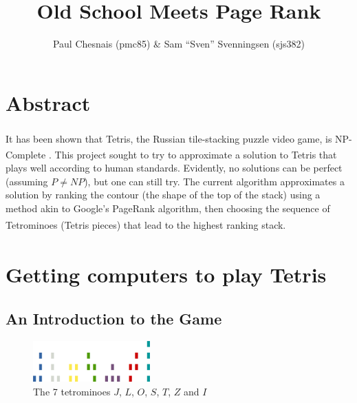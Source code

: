 \documentclass[fontsize=12pt]{article}
\title{Old School \tetris{} Meets Page Rank}
\author{Paul Chesnais (pmc85) \& Sam ``Sven'' Svenningsen (sjs382)}
\date{}
\def\tetris{Tetris\textsuperscript{\textregistered}}
\begin{document}
\maketitle
\thispagestyle{empty}
\section{Abstract}
\label{sec:abstract}

\par It has been shown that \tetris{}, the Russian tile-stacking puzzle video game, is NP-Complete \cite{bib:tetrishard}. This project sought to try to approximate a solution to \tetris{} that plays well according to human standards. Evidently, no solutions can be perfect (assuming $P \neq NP$), but one can still try. The current algorithm approximates a solution by ranking the contour (the shape of the top of the stack) using a method akin to Google's PageRank algorithm, then choosing the sequence of Tetrominoes (\tetris{} pieces) that lead to the highest ranking stack.

\section{Getting computers to play \tetris{}}
\label{sec:getting_computers_to_play_tetris}

\subsection{An Introduction to the Game}
\label{sub:an_introduction_to_the_game}

\begin{figure}[h!]
  \centering
  \includegraphics[width=0.4\textwidth, height=0.1\textwidth]{figures/pieces}
  \caption{The 7 tetrominoes $J$, $L$, $O$, $S$, $T$, $Z$ and $I$ }
  \label{fig:the_7_tetrominoes}
\end{figure}
\end{document}
